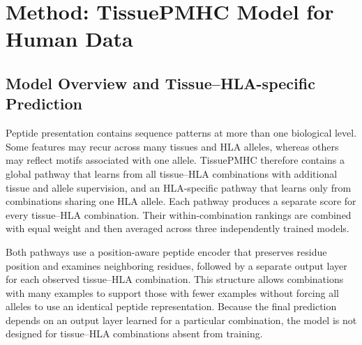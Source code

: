 \section{Method: TissuePMHC Model for Human Data}

\subsection{Model Overview and Tissue--HLA-specific Prediction}

Peptide presentation contains sequence patterns at more than one biological level. Some features may recur across many tissues and HLA alleles, whereas others may reflect motifs associated with one allele. TissuePMHC therefore contains a global pathway that learns from all tissue--HLA combinations with additional tissue and allele supervision, and an HLA-specific pathway that learns only from combinations sharing one HLA allele. Each pathway produces a separate score for every tissue--HLA combination. Their within-combination rankings are combined with equal weight and then averaged across three independently trained models.

Both pathways use a position-aware peptide encoder that preserves residue position and examines neighboring residues, followed by a separate output layer for each observed tissue--HLA combination. This structure allows combinations with many examples to support those with fewer examples without forcing all alleles to use an identical peptide representation. Because the final prediction depends on an output layer learned for a particular combination, the model is not designed for tissue--HLA combinations absent from training.

